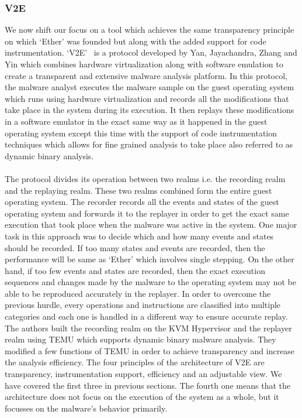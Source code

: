 \documentclass[11pt]{article}
\begin{document}
	\subsubsection{V2E}
	We now shift our focus on a tool which achieves the same transparency principle on which ‘Ether’ was founded but along with the added support for code instrumentation. ‘V2E’~\cite{yan2012v2e} is a protocol developed by Yan, Jayachandra, Zhang and Yin which combines hardware virtualization along with software emulation to create a transparent and extensive malware analysis platform. In this protocol, the malware analyst executes the malware sample on the guest operating system which runs using hardware virtualization and records all the modifications that take place in the system during its execution. It then replays these modifications in a software emulator in the exact same way as it happened in the guest operating system except this time with the support of code instrumentation techniques which allows for fine grained analysis to take place also referred to as dynamic binary analysis.\\ \\
	The protocol divides its operation between two realms i.e. the recording realm and the replaying realm. These two realms combined form the entire guest operating system. The recorder records all the events and states of the guest operating system and forwards it to the replayer in order to get the exact same execution that took place when the malware was active in the system. One major task in this approach was to decide which and how many events and states should be recorded. If too many states and events are recorded, then the performance will be same as ‘Ether’ which involves single stepping. On the other hand, if too few events and states are recorded, then the exact execution sequences and changes made by the malware to the operating system may not be able to be reproduced accurately in the replayer. In order to overcome the previous hurdle, every operations and instructions are classified into multiple categories and each one is handled in a different way to ensure accurate replay. The authors built the recording realm on the KVM Hypervisor and the replayer realm using TEMU which supports dynamic binary malware analysis. They modified a few functions of TEMU in order to achieve transparency and increase the analysis efficiency. The four principles of the architecture of V2E are transparency, instrumentation support, efficiency and an adjustable view. We have covered the first three in previous sections. The fourth one means that the architecture does not focus on the execution of the system as a whole, but it focusses on the malware’s behavior primarily.\\ \\
\end{document}
